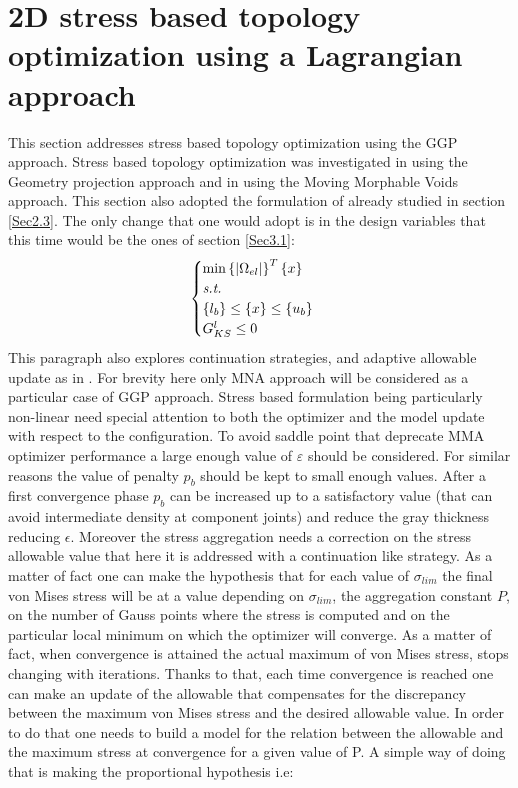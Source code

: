 \section{2D stress based topology optimization using a Lagrangian approach}
\label{IS}
This section addresses stress based topology optimization using the GGP approach. Stress based topology optimization was investigated in \cite{ZHANG20171} using the Geometry projection approach and in \cite{zhang2018moving} using the Moving Morphable Voids approach. This section also adopted the formulation of \cite{verbart2017unified} already studied in section \ref{Sec2.3}. The only change that one would adopt is in the design variables that this time would be the ones of section \ref{Sec3.1}:
\begin{equation}
\begin{cases}
\label{Verbart_formulation_GGP}
\min {\ensuremath\left\lbrace{|\Omega_{el}|}\right \rbrace^T\ensuremath\left\lbrace{x}\right \rbrace} \\
\textit{s.t.}\\
\left\lbrace{l_b}\right \rbrace\leq\left\lbrace{x}\right \rbrace\leq\left\lbrace{u_b}\right \rbrace\\
G^{l}_{KS}\leq 0 
\end{cases}
\end{equation}
This paragraph also explores continuation strategies, and adaptive allowable update as in \cite{le2010stress,ZHANG20171}. For brevity here only MNA approach will be considered as a particular case of GGP approach. Stress based formulation being particularly non-linear need special attention to both the optimizer and the model update with respect to the configuration. 
To avoid saddle point that deprecate MMA optimizer performance a large enough value of $\varepsilon$ should be considered. For similar reasons the value of penalty $p_b$ should be kept to small enough values. After a first convergence phase $p_b$ can be increased up to a satisfactory value (that can avoid intermediate density at component joints) and reduce the gray thickness reducing $\epsilon$. Moreover the stress aggregation needs a correction on the stress allowable value that here it is addressed with a continuation like strategy. 
As a matter of fact one can make the hypothesis that for each value of $\sigma_{lim}$ the final von Mises stress will be at a value depending on $\sigma_{lim}$, the aggregation constant $P$, on the number of Gauss points where the stress is computed and on the particular local minimum on which the optimizer will converge. As a matter of fact, when convergence is attained the actual maximum of von Mises stress, stops changing with iterations. Thanks to that, each time convergence is reached one can make an update of the allowable that compensates for the discrepancy between the maximum von Mises stress and the desired allowable value. In order to do that one needs to build a model for the relation between the allowable and the maximum stress at convergence for a given value of P. A simple way of doing that is making the proportional hypothesis i.e:
